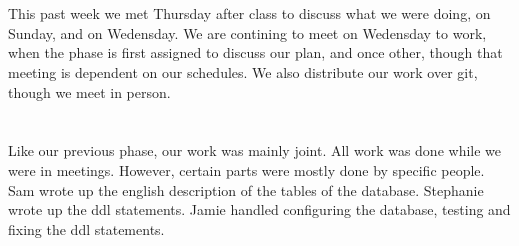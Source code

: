 \documentclass{article}
\begin{document}
\section{}




\section{}
This past week we met Thursday after class to discuss what we were doing, on
Sunday, and on Wedensday. We are contining to meet on Wedensday to work, when
the phase is first assigned to discuss our plan, and once other, though that
meeting is dependent on our schedules. We also distribute our work over git,
though we meet in person.

\section{}
Like our previous phase, our work was mainly joint. All work was done while we
were in meetings. However, certain parts were mostly done by specific people.
Sam wrote up the english description of the tables of the database. Stephanie
wrote up the ddl statements. Jamie handled configuring the database, testing and
fixing the ddl statements.  
\end{document}
